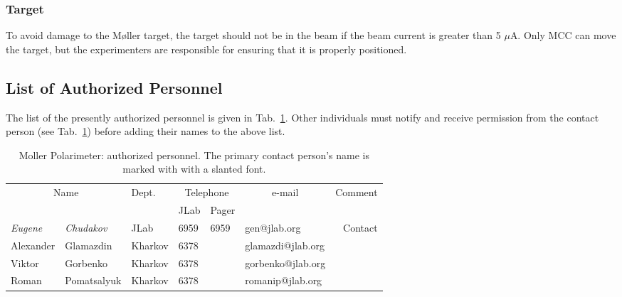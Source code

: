 \begin{safetyen}{50}{50}
\subsubsection{Target}

To avoid damage to the M{\o}ller target, the target should not be in the beam 
if the beam current is greater than
5 $\mu$A. Only MCC can move the target, but the experimenters
are responsible for ensuring that it is properly positioned.\\
\end{safetyen}


\begin{safetyen}{0}{0}
\subsection{List of Authorized  Personnel}
\end{safetyen}
The list of the presently authorized personnel is given in Tab.~\ref{tab:moller:personnel}.
Other individuals must notify and receive permission from
the contact person (see Tab.~\ref{tab:moller:personnel}) before adding their names 
to the above list.

%
\begin{table}[ht]
\begin{center}
\begin{tabular}{|ll|l|l|l|l|r|} \hline
  \multicolumn{2}{|c|}{Name} & Dept. & \multicolumn{2}{c|}{Telephone} & 
  \multicolumn{1}{c|}{e-mail} & Comment \\ 
  \cline{4-5}
   &  &   & JLab & Pager &  & \\ 
\hline
 {\em Eugene} & {\em Chudakov}  & JLab    & 6959 & 6959 & gen@jlab.org      & Contact     \\ 
 Alexander    & Glamazdin       & Kharkov & 6378 &      & glamazdi@jlab.org &  \\ 
 Viktor       & Gorbenko        & Kharkov & 6378 &      & gorbenko@jlab.org &  \\ 
 Roman        & Pomatsalyuk     & Kharkov & 6378 &      & romanip@jlab.org  &  \\ 
\hline
\end{tabular}
\end{center}
\caption{Moller Polarimeter: authorized personnel. The primary contact person's
 name is marked with with a slanted font. 
}
\label{tab:moller:personnel}
\end{table}
 
